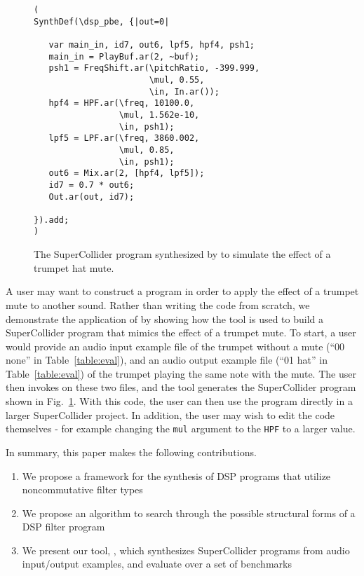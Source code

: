 \begin{figure}
\begin{lstlisting}
( 
SynthDef(\dsp_pbe, {|out=0|

   var main_in, id7, out6, lpf5, hpf4, psh1;
   main_in = PlayBuf.ar(2, ~buf);
   psh1 = FreqShift.ar(\pitchRatio, -399.999, 
                       \mul, 0.55, 
                       \in, In.ar());
   hpf4 = HPF.ar(\freq, 10100.0, 
                 \mul, 1.562e-10, 
                 \in, psh1);
   lpf5 = LPF.ar(\freq, 3860.002, 
                 \mul, 0.85, 
                 \in, psh1);
   out6 = Mix.ar(2, [hpf4, lpf5]);
   id7 = 0.7 * out6;
   Out.ar(out, id7);

}).add;
)
\end{lstlisting}
\caption{The SuperCollider program synthesized by \ourTool to simulate the effect of a trumpet hat mute.}
\label{fig:sc_code}
\end{figure}

A user may want to construct a program in order to apply the effect of a trumpet mute to another sound.
Rather than writing the code from scratch, we demonstrate the application of \ourTool by showing how the tool is used to build a SuperCollider program that mimics the effect of a trumpet mute.
To start, a user would provide an audio input example file of the trumpet without a mute (``00 none'' in Table~\ref{table:eval}), and an audio output example file (``01 hat'' in Table~\ref{table:eval}) of the trumpet playing the same note with the mute.
The user then invokes \ourTool on these two files, and the tool generates the SuperCollider program shown in Fig.~\ref{fig:sc_code}.
With this code, the user can then use the program directly in a larger SuperCollider project.
In addition, the user may wish to edit the code themselves - for example changing the \texttt{mul} argument to the \texttt{HPF} to a larger value.

In summary, this paper makes the following contributions.

\begin{enumerate}
\item We propose a framework for the synthesis of DSP programs that utilize noncommutative filter types 
\item We propose an algorithm to search through the possible structural forms of a DSP filter program
\item We present our tool, \ourTool, which synthesizes SuperCollider programs from audio input/output examples, and evaluate \ourTool over a set of benchmarks
\end{enumerate}


